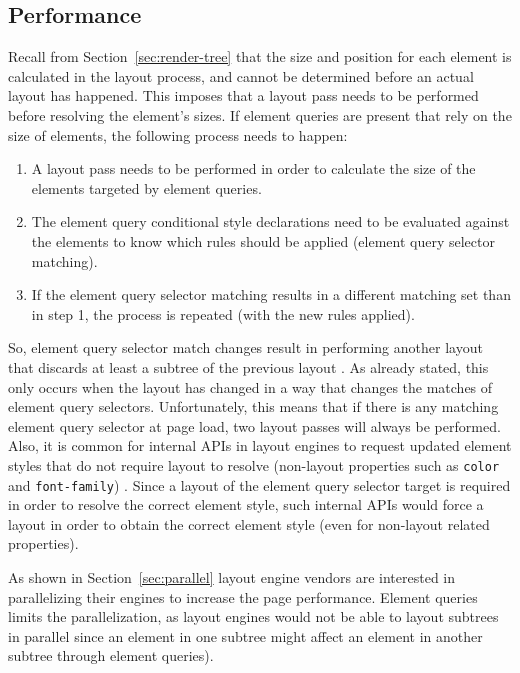 \documentclass[a4paper,11pt]{kth-mag}
\newcommand{\code}[1]{\texttt{#1}}
\begin{document}
      \subsection{Performance}
        Recall from Section~\ref{sec:render-tree} that the size and position for each \gls{element} is calculated in the layout process, and cannot be determined before an actual layout has happened.
        This imposes that a layout pass needs to be performed before resolving the \gls{element}'s sizes.
        If element queries are present that rely on the size of \glspl{element}, the following process needs to happen:
        \begin{enumerate}
          \item A layout pass needs to be performed in order to calculate the size of the \glspl{element} targeted by element queries.
          \item The element query conditional style declarations need to be evaluated against the \glspl{element} to know which rules should be applied (element query selector matching).
          \item If the element query selector matching results in a different matching set than in step 1, the process is repeated (with the new rules applied).
        \end{enumerate}
        So, element query selector match changes result in performing another layout that discards at least a subtree of the previous layout \cite{w3c_eq_mail}.
        As already stated, this only occurs when the layout has changed in a way that changes the matches of element query selectors.
        Unfortunately, this means that if there is any matching element query selector at page load, two layout passes will always be performed.
        Also, it is common for internal \glspl{API} in \glspl{layout engine} to request updated \gls{element} styles that do not require layout to resolve (non-layout properties such as \code{color} and \code{font-family}) \cite{w3c_eq_mail}.
        Since a layout of the element query selector target is required in order to resolve the correct \gls{element} style, such internal \glspl{API} would force a layout in order to obtain the correct \gls{element} style (even for non-layout related properties).

        As shown in Section~\ref{sec:parallel} \gls{layout engine} vendors are interested in parallelizing their engines to increase the page performance.
        Element queries limits the parallelization, as \glspl{layout engine} would not be able to layout subtrees in parallel since an \gls{element} in one subtree might affect an \gls{element} in another subtree through element queries).
\end{document}
